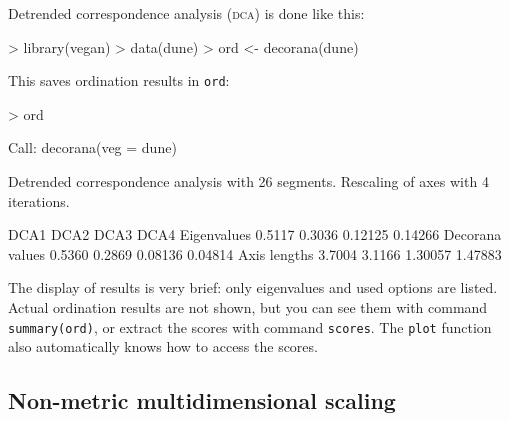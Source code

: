 \documentclass[a4paper,10pt]{amsart}
\begin{document}
Detrended correspondence analysis (\textsc{dca}) is done like this:
\begin{Schunk}
\begin{Sinput}
> library(vegan)
> data(dune)
> ord <- decorana(dune)
\end{Sinput}
\end{Schunk}
This saves ordination results in \texttt{ord}:
\begin{Schunk}
\begin{Sinput}
> ord
\end{Sinput}
\begin{Soutput}
Call:
decorana(veg = dune) 

Detrended correspondence analysis with 26 segments.
Rescaling of axes with 4 iterations.

                  DCA1   DCA2    DCA3    DCA4
Eigenvalues     0.5117 0.3036 0.12125 0.14266
Decorana values 0.5360 0.2869 0.08136 0.04814
Axis lengths    3.7004 3.1166 1.30057 1.47883
\end{Soutput}
\end{Schunk}
The display of results is very brief: only eigenvalues and used
options are listed.  Actual ordination results are not shown, but you
can see them with command \texttt{summary(ord)}, or extract the scores
with command \texttt{scores}.  The \texttt{plot} function also
automatically knows how to access the scores.

\subsection{Non-metric multidimensional scaling}
\end{document}
